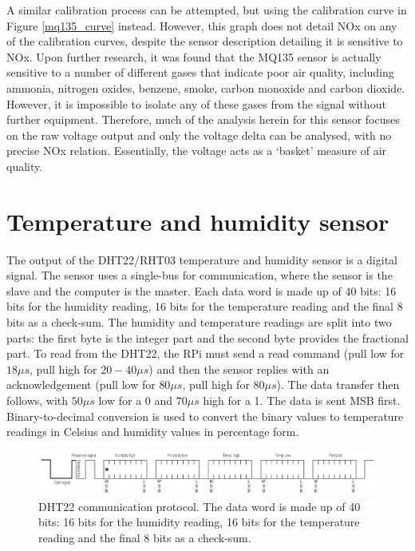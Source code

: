 \documentclass[11pt]{report}
\begin{document}
A similar calibration process can be attempted, but using the calibration curve in Figure \ref{mq135_curve} instead. However, this graph does not detail NOx on any of the calibration curves, despite the sensor description detailing it is sensitive to NOx. Upon further research, it was found that the MQ135 sensor is actually sensitive to a number of different gases that indicate poor air quality, including ammonia, nitrogen oxides, benzene, smoke, carbon monoxide and carbon dioxide. However, it is impossible to isolate any of these gases from the signal without further equipment. Therefore, much of the analysis herein for this sensor focuses on the raw voltage output and only the voltage delta can be analysed, with no precise NOx relation. Essentially, the voltage acts as a `basket' measure of air quality.

\section{Temperature and humidity sensor}

The output of the DHT22/RHT03 temperature and humidity sensor is a digital signal. The sensor uses a single-bus for communication, where the sensor is the slave and the computer is the master. Each data word is made up of 40 bits: 16 bits for the humidity reading, 16 bits for the temperature reading and the final 8 bits as a check-sum. The humidity and temperature readings are split into two parts: the first byte is the integer part and the second byte provides the fractional part. To read from the DHT22, the RPi must send a read command (pull low for $18\mu s$, pull high for $20-40\mu s$) and then the sensor replies with an acknowledgement (pull low for $80\mu s$, pull high for $80\mu s$). The data transfer then follows, with $50\mu s$ low for a 0 and $70\mu s$ high for a 1. The data is sent MSB first. Binary-to-decimal conversion is used to convert the binary values to temperature readings in Celsius and humidity values in percentage form.

\begin{figure}[!tb]
\centering
\includegraphics[width=1\textwidth]{images/dht22_data}
\caption{DHT22 communication protocol. The data word is made up of 40 bits: 16 bits for the humidity reading, 16 bits for the temperature reading and the final 8 bits as a check-sum.}
\label{dht22_data}
\end{figure}
\end{document}
